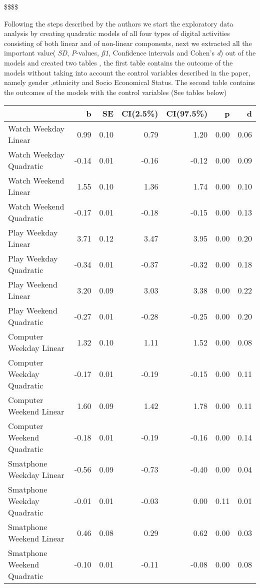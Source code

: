 \documentclass[man]{apa6}
\theoremstyle{definition}
\theoremstyle{definition}
\theoremstyle{definition}
\theoremstyle{remark}
\begin{document}
\$\$\$\$

Following the steps described by the authors we start the exploratory
data analysis by creating quadratic models of all four types of digital
activities consisting of both linear and of non-linear components, next
we extracted all the important value( \emph{SD}, \emph{P}-values,
\emph{ß1}, Confidence intervals and Cohen's \emph{d}) out of the models
and created two tables , the first table contains the outcome of the
models without taking into account the control variables described in
the paper, namely gender ,ethnicity and Socio Economical Status. The
second table contains the outcomes of the models with the control
variables (See tables below)

\begin{tabular}{l|r|r|r|r|r|r}
\hline
  & b & SE & CI(2.5\%) & CI(97.5\%) & p & d\\
\hline
Watch Weekday Linear & 0.99 & 0.10 & 0.79 & 1.20 & 0.00 & 0.06\\
\hline
Watch Weekday Quadratic & -0.14 & 0.01 & -0.16 & -0.12 & 0.00 & 0.09\\
\hline
Watch Weekend Linear & 1.55 & 0.10 & 1.36 & 1.74 & 0.00 & 0.10\\
\hline
Watch Weekend Quadratic & -0.17 & 0.01 & -0.18 & -0.15 & 0.00 & 0.13\\
\hline
Play Weekday Linear & 3.71 & 0.12 & 3.47 & 3.95 & 0.00 & 0.20\\
\hline
Play Weekday Quadratic & -0.34 & 0.01 & -0.37 & -0.32 & 0.00 & 0.18\\
\hline
Play Weekend Linear & 3.20 & 0.09 & 3.03 & 3.38 & 0.00 & 0.22\\
\hline
Play Weekend Quadratic & -0.27 & 0.01 & -0.28 & -0.25 & 0.00 & 0.20\\
\hline
Computer Weekday Linear & 1.32 & 0.10 & 1.11 & 1.52 & 0.00 & 0.08\\
\hline
Computer Weekday Quadratic & -0.17 & 0.01 & -0.19 & -0.15 & 0.00 & 0.11\\
\hline
Computer Weekend Linear & 1.60 & 0.09 & 1.42 & 1.78 & 0.00 & 0.11\\
\hline
Computer Weekend Quadratic & -0.18 & 0.01 & -0.19 & -0.16 & 0.00 & 0.14\\
\hline
Smatphone Weekday Linear & -0.56 & 0.09 & -0.73 & -0.40 & 0.00 & 0.04\\
\hline
Smatphone Weekday Quadratic & -0.01 & 0.01 & -0.03 & 0.00 & 0.11 & 0.01\\
\hline
Smatphone Weekend Linear & 0.46 & 0.08 & 0.29 & 0.62 & 0.00 & 0.03\\
\hline
Smatphone Weekend Quadratic & -0.10 & 0.01 & -0.11 & -0.08 & 0.00 & 0.08\\
\hline
\end{tabular}
\end{document}

